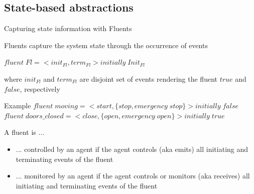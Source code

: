 \documentclass[11pt]{beamer}
\begin{document}
\subsection{State-based abstractions}
\begin{frame}{Capturing state information with Fluents}
	\begin{block}{Fluents capture the system state through the occurrence of events \cite{Milner99}}
		\begin{center}
			$fluent\;Fl = <init_{Fl}, term_{Fl}> initially\;Init_{Fl}$
		\end{center}
		\vspace{-0.4cm}
		where $init_{Fl}$ and $term_{Fl}$ are disjoint set of events rendering the fluent $true$ and $false$, respectively
	\end{block}
	\begin{block}{Example}
		\small
		$fluent\;moving = <start, \{stop, emergency\;stop\}> initially\;false$
		$fluent\;doors\_closed = <close, \{open, emergency\;open\}> initially\;true$
	\end{block}
	\begin{block}{A fluent is ...}
	  	\begin{itemize}
		  	\item ... controlled by an agent if the agent controls (aka emits) all initiating and terminating events of the fluent \cite{Damas06}
			\item ... monitored by an agent if the agent controls or monitors (aka receives) all initiating and terminating events of the fluent
		\end{itemize}
	\end{block}
\end{frame}
\end{document}
